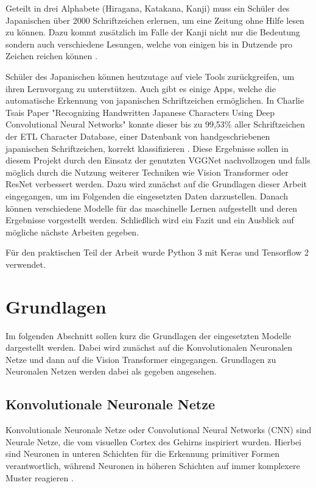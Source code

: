 \documentclass[twoside,a4paper]{IEEEtran}
\begin{document}
Geteilt in drei Alphabete (Hiragana, Katakana, Kanji) muss ein Schüler des Japanischen über 2000 Schriftzeichen erlernen, um eine Zeitung ohne Hilfe lesen zu können. Dazu kommt zusätzlich im Falle der Kanji nicht nur die Bedeutung sondern auch verschiedene Lesungen, welche von einigen bis in Dutzende pro Zeichen reichen können \cite{ABOUT_JAPANESE}.

Schüler des Japanischen können heutzutage auf viele Tools zurückgreifen, um ihren Lernvorgang zu unterstützen. Auch gibt es einige Apps, welche die automatische Erkennung von japanischen Schriftzeichen ermöglichen. In Charlie Tsais Paper "Recognizing Handwritten Japanese Characters Using Deep Convolutional Neural Networks" konnte dieser bis zu 99,53\% aller Schriftzeichen der ETL Character Database, einer Datenbank von handgeschriebenen japanischen Schriftzeichen, korrekt klassifizieren \cite{RHC}. Diese Ergebnisse sollen in diesem Projekt durch den Einsatz der genutzten VGGNet nachvollzogen und falls möglich durch die Nutzung weiterer Techniken wie Vision Transformer oder ResNet verbessert werden. Dazu wird zunächst auf die Grundlagen dieser Arbeit eingegangen, um im Folgenden die eingesetzten Daten darzustellen. Danach können verschiedene Modelle für das maschinelle Lernen aufgestellt und deren Ergebnisse vorgestellt werden. Schließlich wird ein Fazit und ein Ausblick auf mögliche nächste Arbeiten gegeben.

Für den praktischen Teil der Arbeit wurde Python 3 mit Keras und Tensorflow 2 verwendet.
\section{Grundlagen}
Im folgenden Abschnitt sollen kurz die Grundlagen der eingesetzten Modelle dargestellt werden. Dabei wird zunächst auf die Konvolutionalen Neuronalen Netze und dann auf die Vision Transformer eingegangen. Grundlagen zu Neuronalen Netzen werden dabei als gegeben angesehen.
\subsection{Konvolutionale Neuronale Netze} %
Konvolutionale Neuronale Netze oder Convolutional Neural Networks (CNN) sind Neurale Netze, die vom visuellen Cortex des Gehirns inspiriert wurden. Hierbei sind Neuronen in unteren Schichten für die Erkennung primitiver Formen verantwortlich, während Neuronen in höheren Schichten auf immer komplexere Muster reagieren \cite[S.360]{MACHINE_LEARNING}. 
\end{document}
